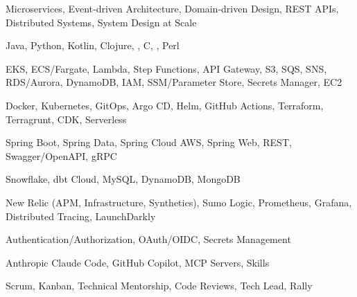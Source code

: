 
\begin{cvskills}

    {Microservices, Event-driven Architecture, Domain-driven Design, REST APIs, Distributed Systems, System Design at Scale} %

    {Java, Python, Kotlin, Clojure, \CS{}, C, \CC{}, Perl} %

    {EKS, ECS/Fargate, Lambda, Step Functions, API Gateway, S3, SQS, SNS, RDS/Aurora, DynamoDB, IAM, SSM/Parameter Store, Secrets Manager, EC2} %

    {Docker, Kubernetes, GitOps, Argo CD, Helm, GitHub Actions, Terraform, Terragrunt, CDK, Serverless} %

    {Spring Boot, Spring Data, Spring Cloud AWS, Spring Web, REST, Swagger/OpenAPI, gRPC} %

    {Snowflake, dbt Cloud, MySQL, DynamoDB, MongoDB} %

    {New Relic (APM, Infrastructure, Synthetics), Sumo Logic, Prometheus, Grafana, Distributed Tracing, LaunchDarkly} %

    {Authentication/Authorization, OAuth/OIDC, Secrets Management} %

    {Anthropic Claude Code, GitHub Copilot, MCP Servers, Skills} %

    {Scrum, Kanban, Technical Mentorship, Code Reviews, Tech Lead, Rally} %

\end{cvskills}
